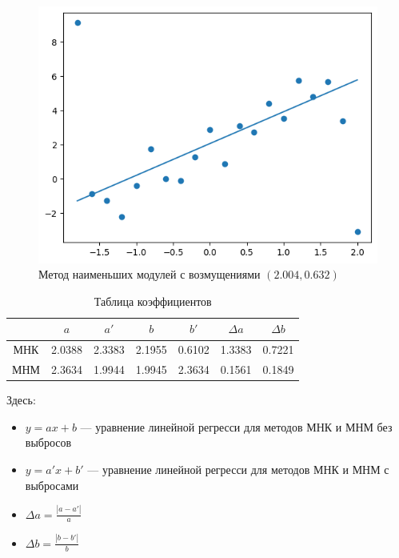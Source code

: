 \documentclass[12pt,a4paper]{article}
\begin{document}
	\begin{figure}[htbp!]
		\begin{center}
			\includegraphics[width = 1\linewidth]{graphics/lab6_sq_mod.png}
			\caption{Метод наименьших модулей с возмущениями \( (2.004, 0.632) \)}
		\end{center}
	\end{figure}

	\clearpage

	\begin{table}[htbp]
		\centering
		\begin{tabular}{ |c|c|c|c|c|c|c| }
			\hline
			& \( a \)  & \( a' \) & \( b \) & \( b' \) & \( \Delta a \) & \( \Delta b \) \\
			\hline
			МНК & 2.0388 & 2.3383 & 2.1955 & 0.6102 & 1.3383 & 0.7221 \\ \hline
			МНМ & 2.3634 & 1.9944  & 1.9945 & 2.3634 & 0.1561 & 0.1849 \\ \hline
		\end{tabular}
		\caption{Таблица коэффициентов}
	\end{table}

	Здесь:

	\begin{itemize}
		\item \( y = ax + b \) — уравнение линейной регресси для методов МНК и
			МНМ без выбросов
		\item \( y = a'x + b' \) — уравнение линейной регресси для методов МНК и
			МНМ с выбросами
		\item \( \Delta a = \frac{|a - a'|}{a} \)
		\item \( \Delta b = \frac{|b - b'|}{b} \)
	\end{itemize}
\end{document}
